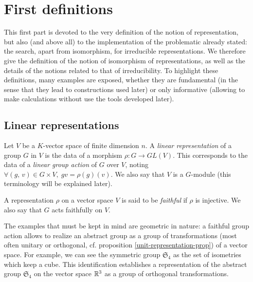 \section{First definitions}
 
This first part is devoted to the very definition of the notion of representation, but also (and above all) to the implementation of the problematic already stated: the search, apart from isomorphism, for irreducible representations. We therefore give the definition of the notion of isomorphism of representations, as well as the details of the notions related to that of irreducibility. To highlight these definitions, many examples are exposed, whether they are fundamental (in the sense that they lead to constructions used later) or only informative (allowing to make  calculations without use the tools developed later).
\subsection{Linear representations}
 
 
 
 
\begin{defn}
\label{defn-linear-representation}
  \label{notation-70} Let $V$ be a $K$-vector space of finite dimension $ n $. A \textit{linear representation} of a group $G$ in $V$ is the data of a morphism $ \rho: G \rightarrow GL (V) $. This corresponds to the data of a \textit{linear group action} of $G$ over $V$, noting $ \forall (g, \, v) \in G \times V, \; gv = \rho (g) (v) $. We also say that $V$ is a $G$-module (this terminology will be explained later).
\end{defn}
 
 
\begin{defn}
  A representation $ \rho $ on a vector space $V$ is said to be \textit{faithful} if $ \rho $ is injective. We also say that $G$ acts faithfully on $V$.
\end{defn}
 
 
\begin{exmp}
   The examples that must be kept in mind are geometric in nature: a faithful group action allows to realize an abstract group as a group of transformations (most often unitary or orthogonal, cf. proposition \ref{unit-representation-prop}) of a vector space. For example, we can see the symmetric group $ \mathfrak{S}_4 $ as the set of isometries which keep a cube. This identification establishes a representation of the abstract group $ \mathfrak{S}_4 $ on the vector space $ \mathbb{R}^3 $ as a group of orthogonal transformations.
\end{exmp}
 

